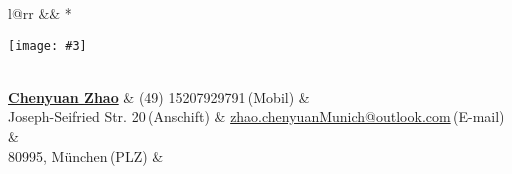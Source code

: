 \newcommand{\paint}[3]{
    \begin{minipage}{#1}
        \texttt{[image: \#3]}
    \end{minipage} 
}
\newcommand{\myheader}{
\begin{tabular*}{\textwidth}{l@{\extracolsep{\fill}}rr}
  && \multirow{4}*{\paint{2.6cm}{3.2cm}{./ChenyuanZHAO.jpg}}\\
  \specialrule{0em}{4pt}{4pt}
  \textbf{\href{http://herechen.github.io}{\LARGE Chenyuan Zhao}} & (49) 15207929791$\,${\color{labelgrey}(Mobil)} &\\
  Joseph-Seifried Str. 20$\,${\color{labelgrey}(Anschift)} & \href{mailto:zhao.chenyuanMunich@outlook.com}{zhao.chenyuanMunich@outlook.com}$\,${\color{labelgrey}(E-mail)} & \\
  80995, München$\,${\color{labelgrey}(PLZ)} 
  & %
  \end{tabular*}\\\vspace{0.1in}
}

\myheader


